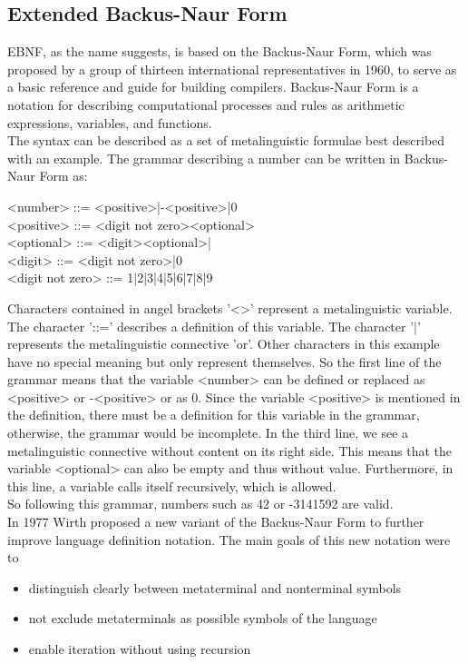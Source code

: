 \subsection{Extended Backus-Naur Form}\label{sec:EBNF}
\ac{EBNF}, as the name suggests, is based on the Backus-Naur Form, which was proposed by a group of thirteen international representatives in 1960, to serve as a basic reference and guide for building compilers. Backus-Naur Form is a notation for describing computational processes and rules as arithmetic expressions, variables, and functions. \parencite[cf.][p. 300]{backus_report_1960}\\
The syntax can be described as a set of metalinguistic formulae best described with an example. The grammar describing a number can be written in Backus-Naur Form as:
\begin{grammar}
    <number> ::= <positive>|-<positive>|0 \\
    <positive> ::= <digit not zero><optional> \\
    <optional> ::= <digit><optional>| \\
    <digit> ::= <digit not zero>|0 \\
    <digit not zero> ::= 1|2|3|4|5|6|7|8|9
\end{grammar}
Characters contained in angel brackets '<>' represent a metalinguistic variable. The character '::=' describes a definition of this variable. The character '|' represents the metalinguistic connective 'or'. Other characters in this example have no special meaning but only represent themselves. So the first line of the grammar means that the variable <number> can be defined or replaced as <positive> or -<positive> or as 0. Since the variable <positive> is mentioned in the definition, there must be a definition for this variable in the grammar, otherwise, the grammar would be incomplete. In the third line, we see a metalinguistic connective without content on its right side. This means that the variable <optional> can also be empty and thus without value. Furthermore, in this line, a variable calls itself recursively, which is allowed. \parencite[cf.][pp. 301-303]{backus_report_1960}\\
So following this grammar, numbers such as 42 or -3141592 are valid.\\
In 1977 Wirth proposed a new variant of the Backus-Naur Form to further improve language definition notation. The main goals of this new notation were to \parencite[cf.][p. 822]{wirth_what_1977}
\begin{itemize}[noitemsep]
    \item distinguish clearly between metaterminal and nonterminal symbols
    \item not exclude metaterminals as possible symbols of the language
    \item enable iteration without using recursion
\end{itemize}
